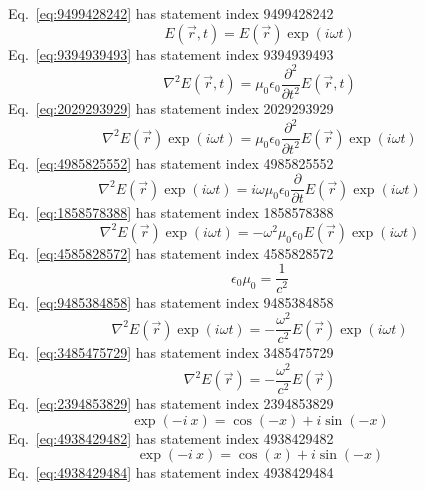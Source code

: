 \documentclass[12pt]{report}
\begin{document}
Eq.~\ref{eq:9499428242} has statement index 9499428242
\begin{equation}
E(\vec{r},t)=E(\vec{r})\exp(i \omega t)
\label{eq:9499428242}
\end{equation}
Eq.~\ref{eq:9394939493} has statement index 9394939493
\begin{equation}
\nabla^2 E(\vec{r},t)= \mu_0 \epsilon_0 \frac{\partial^2}{\partial t^2} E(\vec{r},t)
\label{eq:9394939493}
\end{equation}
Eq.~\ref{eq:2029293929} has statement index 2029293929
\begin{equation}
\nabla^2 E(\vec{r})\exp(i \omega t)= \mu_0 \epsilon_0 \frac{\partial^2}{\partial t^2} E(\vec{r})\exp(i \omega t)
\label{eq:2029293929}
\end{equation}
Eq.~\ref{eq:4985825552} has statement index 4985825552
\begin{equation}
\nabla^2 E(\vec{r})\exp(i \omega t)= i \omega \mu_0 \epsilon_0 \frac{\partial}{\partial t} E(\vec{r})\exp(i \omega t)
\label{eq:4985825552}
\end{equation}
Eq.~\ref{eq:1858578388} has statement index 1858578388
\begin{equation}
\nabla^2 E(\vec{r})\exp(i \omega t)= - \omega^2 \mu_0 \epsilon_0 E(\vec{r})\exp(i \omega t)
\label{eq:1858578388}
\end{equation}
Eq.~\ref{eq:4585828572} has statement index 4585828572
\begin{equation}
\epsilon_0 \mu_0 = \frac{1}{c^2}
\label{eq:4585828572}
\end{equation}
Eq.~\ref{eq:9485384858} has statement index 9485384858
\begin{equation}
\nabla^2 E(\vec{r})\exp(i \omega t)= - \frac{\omega^2}{c^2} E(\vec{r})\exp(i \omega t)
\label{eq:9485384858}
\end{equation}
Eq.~\ref{eq:3485475729} has statement index 3485475729
\begin{equation}
\nabla^2 E(\vec{r})= - \frac{\omega^2}{c^2} E(\vec{r})
\label{eq:3485475729}
\end{equation}
Eq.~\ref{eq:2394853829} has statement index 2394853829
\begin{equation}
\exp(-i\ x) = \cos(-x)+i \sin(-x)
\label{eq:2394853829}
\end{equation}
Eq.~\ref{eq:4938429482} has statement index 4938429482
\begin{equation}
\exp(-i\ x) = \cos(x)+i \sin(-x)
\label{eq:4938429482}
\end{equation}
Eq.~\ref{eq:4938429484} has statement index 4938429484
\end{document}
